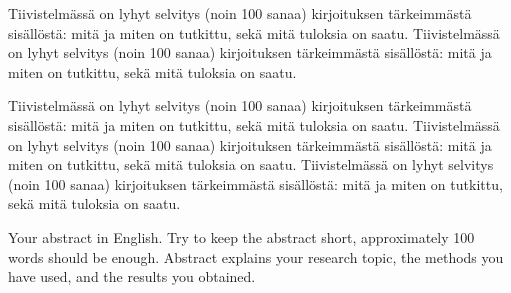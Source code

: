 \documentclass[english,12pt,a4paper,pdftex]{article}
\begin{document}


\makecoverpage


\begin{abstractpage}[finnish]
  Tiivistelmässä on lyhyt selvitys (noin 100 sanaa)
  kirjoituksen tärkeimmästä sisällöstä: mitä ja miten on tutkittu,
  sekä mitä tuloksia on saatu. 
  Tiivistelmässä on lyhyt selvitys (noin 100 sanaa)
  kirjoituksen tärkeimmästä sisällöstä: mitä ja miten on tutkittu,
  sekä mitä tuloksia on saatu. 

  Tiivistelmässä on lyhyt selvitys (noin 100 sanaa)
  kirjoituksen tärkeimmästä sisällöstä: mitä ja miten on tutkittu,
  sekä mitä tuloksia on saatu. 
  Tiivistelmässä on lyhyt selvitys (noin 100 sanaa)
  kirjoituksen tärkeimmästä sisällöstä: mitä ja miten on tutkittu,
  sekä mitä tuloksia on saatu. 
  Tiivistelmässä on lyhyt selvitys (noin 100 sanaa)
  kirjoituksen tärkeimmästä sisällöstä: mitä ja miten on tutkittu,
  sekä mitä tuloksia on saatu. 
\end{abstractpage}

\newpage
%
\begin{abstractpage}[english]
 Your abstract in English. Try to keep the abstract short, approximately 
 100 words should be enough. Abstract explains your research topic, 
 the methods you have used, and the results you obtained.  
\end{abstractpage}
\end{document}

